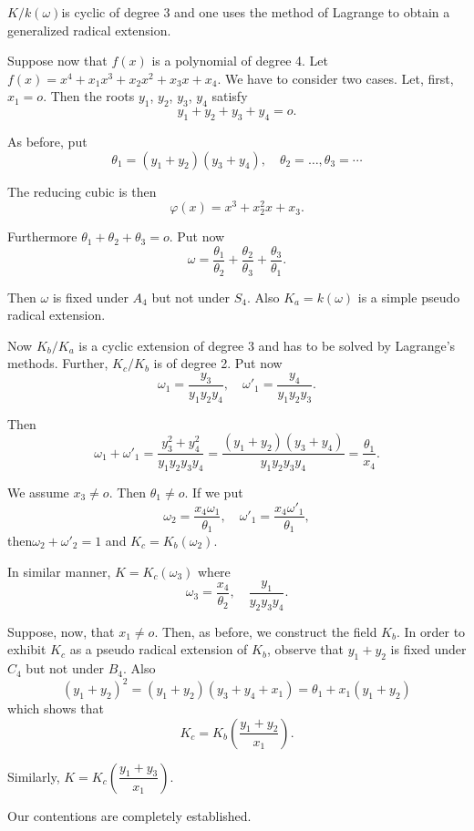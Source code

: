  $K/k(\omega)$\pageoriginale is cyclic of degree 3 and one uses the
 method of Lagrange to obtain a generalized radical extension.  
 
 Suppose now that $f(x)$ is a polynomial of degree 4. Let  $f(x)=
 x^4 +x_1 x^3  +x_2 x^2+x_3 x + x_4$. We have to consider two
 cases. Let, first, $x_1=o$. Then  the roots $y_1$, $y_2$, $y_3$, $y_4$
 satisfy 
 $$
 y_1+y_2+y_3+y_4=o. 
 $$
 
 As before, put
 $$
 \theta_1= (y_1+y_2)(y_3+y_4), \quad \theta_2= \ldots , \theta_3 = \cdots
 $$
 
 The reducing cubic is then 
 $$
 \varphi(x)= x^3 + x^2_2 x+ x_3. 
 $$ 
 
 Furthermore $\theta_1 +  \theta_2+  \theta_3=o$. Put now 
 $$
 \omega= \frac{\theta_1}{\theta_2} + 
 \frac{\theta_2}{\theta_3}+\frac{\theta_3}{\theta_1}.  
 $$
 
 Then $\omega$ is fixed under $A_4$ but not under $S_4$. Also
 $K_a=k(\omega)$ is a simple pseudo radical extension. 
 
 Now $K_b/K_a$ is a cyclic extension of degree 3 and has to be
 solved by Lagrange's methods. Further, $K_c/K_b$ is of degree 2. Put
 now  
 $$
 \omega_1 = \frac{y_3}{y_1y_2y_4},  \quad \omega'_1 = \frac{y_4}{y_1 
   y_2 y_3}. 
 $$
 
 Then
 $$
 \omega_1 +\omega'_1 = \frac{y^2_3 + y^2_4}{y_1y_2y_3y_4}=
 \frac{(y_1+y_2)(y_3+y_4)}{y_1 y_2y_3y_4} = \frac{\theta_1}{x_4}. 
 $$
 
 We assume $x_3 \neq o$. Then $\theta_1 \neq o$. If we put 
 $$ 
 \omega_2 = \frac{x_4 \omega_1}{\theta_1}, \quad \omega'_1= \frac{x_4
   \omega'_1}{\theta_1},  
 $$
 then\pageoriginale $\omega_2+  \omega'_2=1$ and $K_c =K_b(\omega_2)$.  
 
 In similar manner, $K=K_c(\omega_3)$ where 
 $$
 \omega_3 = \frac{x_4}{\theta_2}, \quad  \frac{y_1}{y_2y_3y_4}.
 $$
 
 Suppose, now, that  $x_1 \neq o$. Then, as before, we construct the
 field $K_b$. In order to exhibit $K_c$ as a pseudo radical extension
 of $K_b$, observe that $y_1 +y_2$ is fixed under $C_4$ but not under
 $B_4$. Also 
 $$
 (y_1 +y_2)^2= (y_1+y_2)(y_3+y_4+x_1) = \theta_1 +  x_1(y_1+y_2)
 $$ 
which shows that 
$$
K_c=K_b \left( \frac{y_1+y_2}{x_1} \right).
$$

Similarly, $K=K_c \left(\dfrac{y_1+y_3}{x_1} \right)$.

Our contentions are completely established.


